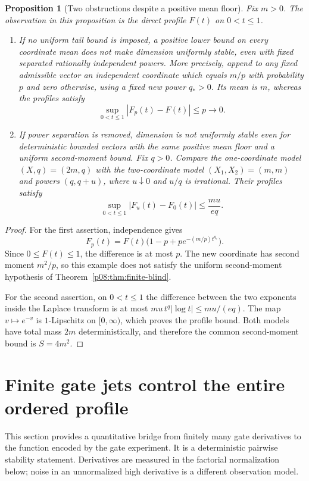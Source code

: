 \documentclass[11pt,letterpaper]{article}
\newtheorem{proposition}[theorem]{Proposition}
\theoremstyle{definition}
\theoremstyle{remark}
\newcommand{\1}{\mathbf 1}
\begin{document}
\begin{proposition}[Two obstructions despite a positive mean floor]
\label{p08:prop:finite-blind-obstructions}
Fix $m>0$.  The observation in this proposition is the direct profile
$F(t)$ on $0<t\leq1$.
\begin{enumerate}
\item If no uniform tail bound is imposed, a positive lower bound on
every coordinate mean does not make dimension uniformly stable, even
with fixed separated rationally independent powers.  More precisely,
append to any fixed admissible vector an independent coordinate which
equals $m/p$ with probability $p$ and zero otherwise, using a fixed new
power $q_*>0$.  Its mean is $m$, whereas the profiles satisfy
\[
 \sup_{0<t\leq1}|F_p(t)-F(t)|\leq p\longrightarrow0.
\]
\item If power separation is removed, dimension is not uniformly
stable even for deterministic bounded vectors with the same positive
mean floor and a uniform second-moment bound.  Fix $q>0$.  Compare
the one-coordinate model $(X,q)=(2m,q)$ with the two-coordinate model
$(X_1,X_2)=(m,m)$ and powers $(q,q+u)$, where $u\downarrow0$ and
$u/q$ is irrational.  Their profiles satisfy
\[
 \sup_{0<t\leq1}|F_u(t)-F_0(t)|\leq\frac{mu}{eq}.
\]
\end{enumerate}
\end{proposition}
\begin{proof}
For the first assertion, independence gives
\[
 F_p(t)=F(t)\bigl(1-p+p e^{-(m/p)t^{q_*}}\bigr).
\]
Since $0\leq F(t)\leq1$, the difference is at most $p$.
The new coordinate has second moment $m^2/p$,
so this example does not satisfy the uniform second-moment hypothesis
of Theorem~\ref{p08:thm:finite-blind}.

For the second assertion, on $0<t\leq1$ the difference between
the two exponents inside the Laplace transform is at most
$mu\,t^q|\log t|\leq mu/(eq)$.
The map $v\mapsto e^{-v}$ is $1$-Lipschitz on $[0,\infty)$,
which proves the profile bound.
Both models have total mass $2m$ deterministically,
and therefore the common second-moment bound is $S=4m^2$.
\end{proof}

\section{Finite gate jets control the entire ordered profile}
\label{p08:sec:gate-jet-stability}

This section provides a quantitative bridge from finitely many gate
derivatives to the function encoded by the gate experiment.  It is a
deterministic pairwise stability statement.  Derivatives are measured in
the factorial normalization below; noise in an unnormalized high derivative
is a different observation model.
\end{document}
